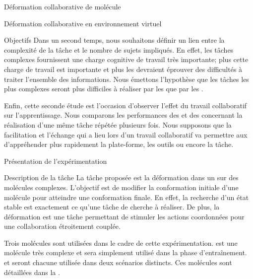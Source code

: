 \documentclass[myfrancais,ngerman,english,frenchb]{mythesis}
\begin{document}
\begin{mychapter}{Déformation collaborative de molécule}
\begin{mysection}{Déformation collaborative en environnement virtuel}
\begin{mysubsection}{Objectifs}
				Dans un second temps, nous souhaitons définir un lien entre la complexité de la tâche et le nombre de sujets impliqués.
				En effet, les tâches complexes fournissent une charge cognitive de travail très importante; plus cette charge de travail est importante et plus les  devraient éprouver des difficultés à traiter l'ensemble des informations.
				Nous émettons l'hypothèse que les tâches les plus complexes seront plus difficiles à réaliser par les  que par les .

				Enfin, cette seconde étude est l'occasion d'observer l'effet du travail collaboratif sur l'apprentissage.
				Nous comparons les performances des  et des  concernant la réalisation d'une même tâche répétée plusieurs fois.
				Nous supposons que la facilitation et l'échange qui a lieu lors d'un travail collaboratif va permettre aux  d'appréhender plus rapidement la plate-forme, les outils ou encore la tâche.
			\end{mysubsection}
		\end{mysection}
		\begin{mysection}{Présentation de l'expérimentation}
			\begin{mysubsection}{Description de la tâche}
				La tâche proposée est la déformation dans un  sur des molécules complexes.
				L'objectif est de modifier la conformation initiale d'une molécule pour atteindre une conformation finale.
				En effet, la recherche d'un état stable est exactement ce qu'une tâche de  cherche à réaliser.
				De plus, la déformation est une tâche permettant de stimuler les actions coordonnées pour une collaboration étroitement couplée.

				Trois molécules sont utilisées dans le cadre de cette expérimentation.
				\myPrion est une molécule très complexe et sera simplement utilisé dans la phase d'entraînement.
				\myTRPZIPPER et \myTRPCAGE seront chacune utilisée dans deux scénarios distincts.
				Ces molécules sont détaillées dans la .


\end{mysubsection}
\end{mysection}
\end{mychapter}
\end{document}

